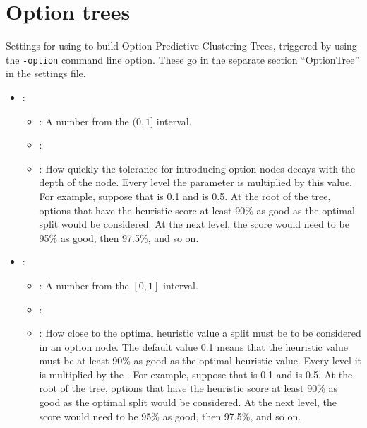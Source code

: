 \section{Option trees}


Settings for using \clus{} to build Option Predictive Clustering Trees, triggered by using the {\tt -option} command line option. These go in the separate section ``OptionTree'' in the settings file. 

\begin{itemize}
    \item {}:
           \begin{itemize}
                \item \optionPossibleValues{}: A number from the $(0,1]$ interval.
                \item \optionDefaultValue{}: 
                \item \optionDescrption{}: How quickly the tolerance for introducing option nodes decays with the depth of the node. Every level the  parameter is multiplied by this value. For example, suppose that  is 0.1 and  is 0.5. At the root of the tree, options that have the heuristic score at least 90\% as good as the optimal split would be considered. At the next level, the score would need to be 95\% as good, then 97.5\%, and so on.
           \end{itemize}
    \item {}:
           \begin{itemize}
                \item \optionPossibleValues{}: A number from the $[0,1]$ interval.
                \item \optionDefaultValue{}: 
                \item \optionDescrption{}: How close to the optimal heuristic value a split must be to be considered in an option node. The default value 0.1 means that the heuristic value must be at least 90\% as good as the optimal heuristic value. Every level it is multiplied by the . For example, suppose that  is 0.1 and  is 0.5. At the root of the tree, options that have the heuristic score at least 90\% as good as the optimal split would be considered. At the next level, the score would need to be 95\% as good, then 97.5\%, and so on.
           \end{itemize}

\end{itemize}
